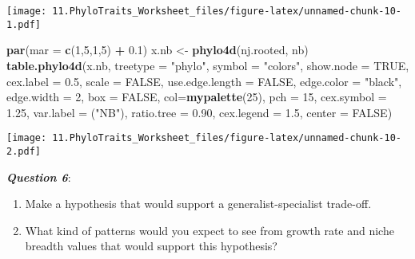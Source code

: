 \documentclass[]{article}
\newenvironment{Shaded}{\begin{snugshade}}{\end{snugshade}}
\newcommand{\KeywordTok}[1]{\textcolor[rgb]{0.13,0.29,0.53}{\textbf{#1}}}
\newcommand{\DataTypeTok}[1]{\textcolor[rgb]{0.13,0.29,0.53}{#1}}
\newcommand{\DecValTok}[1]{\textcolor[rgb]{0.00,0.00,0.81}{#1}}
\newcommand{\FloatTok}[1]{\textcolor[rgb]{0.00,0.00,0.81}{#1}}
\newcommand{\StringTok}[1]{\textcolor[rgb]{0.31,0.60,0.02}{#1}}
\newcommand{\OtherTok}[1]{\textcolor[rgb]{0.56,0.35,0.01}{#1}}
\newcommand{\OperatorTok}[1]{\textcolor[rgb]{0.81,0.36,0.00}{\textbf{#1}}}
\newcommand{\NormalTok}[1]{#1}
\begin{document}
\texttt{[image: 11.PhyloTraits\_Worksheet\_files/figure-latex/unnamed-chunk-10-1.pdf]}

\begin{Shaded}
\begin{Highlighting}[]
\KeywordTok{par}\NormalTok{(}\DataTypeTok{mar =} \KeywordTok{c}\NormalTok{(}\DecValTok{1}\NormalTok{,}\DecValTok{5}\NormalTok{,}\DecValTok{1}\NormalTok{,}\DecValTok{5}\NormalTok{) }\OperatorTok{+}\StringTok{ }\FloatTok{0.1}\NormalTok{)}
\NormalTok{x.nb <-}\StringTok{ }\KeywordTok{phylo4d}\NormalTok{(nj.rooted, nb)}
\KeywordTok{table.phylo4d}\NormalTok{(x.nb, }\DataTypeTok{treetype =} \StringTok{"phylo"}\NormalTok{, }\DataTypeTok{symbol =} \StringTok{"colors"}\NormalTok{, }\DataTypeTok{show.node =} \OtherTok{TRUE}\NormalTok{,}
              \DataTypeTok{cex.label =} \FloatTok{0.5}\NormalTok{, }\DataTypeTok{scale =} \OtherTok{FALSE}\NormalTok{, }\DataTypeTok{use.edge.length =} \OtherTok{FALSE}\NormalTok{,}
              \DataTypeTok{edge.color =} \StringTok{"black"}\NormalTok{, }\DataTypeTok{edge.width =} \DecValTok{2}\NormalTok{, }\DataTypeTok{box =} \OtherTok{FALSE}\NormalTok{,}
              \DataTypeTok{col=}\KeywordTok{mypalette}\NormalTok{(}\DecValTok{25}\NormalTok{), }\DataTypeTok{pch =} \DecValTok{15}\NormalTok{, }\DataTypeTok{cex.symbol =} \FloatTok{1.25}\NormalTok{, }\DataTypeTok{var.label =}\NormalTok{ (}\StringTok{"NB"}\NormalTok{), }
              \DataTypeTok{ratio.tree =} \FloatTok{0.90}\NormalTok{, }\DataTypeTok{cex.legend =} \FloatTok{1.5}\NormalTok{, }\DataTypeTok{center =} \OtherTok{FALSE}\NormalTok{)}
\end{Highlighting}
\end{Shaded}

\texttt{[image: 11.PhyloTraits\_Worksheet\_files/figure-latex/unnamed-chunk-10-2.pdf]}

\textbf{\emph{Question 6}}:

\begin{enumerate}
\def\labelenumi{\alph{enumi})}
\item
  Make a hypothesis that would support a generalist-specialist
  trade-off.
\item
  What kind of patterns would you expect to see from growth rate and
  niche breadth values that would support this hypothesis?
\end{enumerate}
\end{document}
